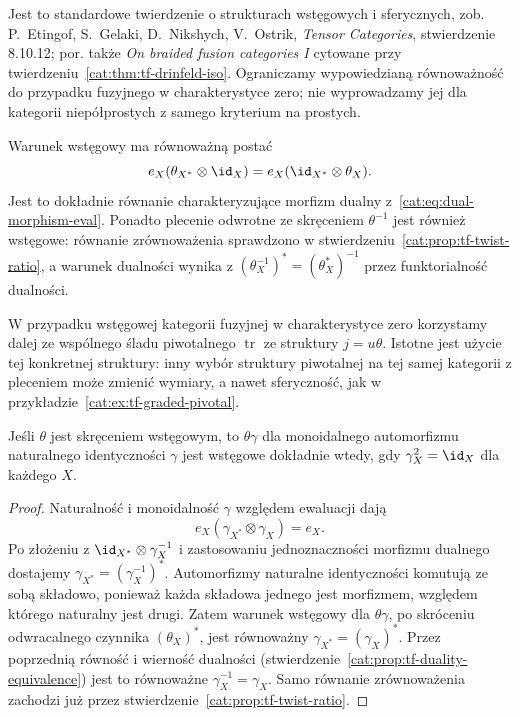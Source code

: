 Jest to standardowe twierdzenie o strukturach wstęgowych i sferycznych, zob. P.~Etingof, S.~Gelaki, D.~Nikshych, V.~Ostrik, \emph{Tensor Categories}, stwierdzenie 8.10.12; por. także \emph{On braided fusion categories I} cytowane przy twierdzeniu~\ref{cat:thm:tf-drinfeld-iso}. Ograniczamy wypowiedzianą równoważność do przypadku fuzyjnego w charakterystyce zero; nie wyprowadzamy jej dla kategorii niepółprostych z samego kryterium na prostych.

Warunek wstęgowy ma równoważną postać
\[
 e_X(\theta_{X^*}\otimes\id_X)
 =e_X(\id_{X^*}\otimes\theta_X).
\]
Jest to dokładnie równanie charakteryzujące morfizm dualny z~\eqref{cat:eq:dual-morphism-eval}. Ponadto plecenie odwrotne ze skręceniem $\theta^{-1}$ jest również wstęgowe: równanie zrównoważenia sprawdzono w stwierdzeniu~\ref{cat:prop:tf-twist-ratio}, a warunek dualności wynika z $(\theta_X^{-1})^*=(\theta_X^*)^{-1}$ przez funktorialność dualności.

W przypadku wstęgowej kategorii fuzyjnej w charakterystyce zero korzystamy dalej ze wspólnego śladu piwotalnego $\operatorname{tr}$ ze struktury $j=u\theta$. Istotne jest użycie tej konkretnej struktury: inny wybór struktury piwotalnej na tej samej kategorii z pleceniem może zmienić wymiary, a nawet sferyczność, jak w przykładzie~\ref{cat:ex:tf-graded-pivotal}.

\begin{stwierdzenie}\label{cat:prop:tf-ribbon-ratio}
Jeśli $\theta$ jest skręceniem wstęgowym, to $\theta\gamma$ dla monoidalnego automorfizmu naturalnego identyczności $\gamma$ jest wstęgowe dokładnie wtedy, gdy $\gamma_X^2=\id_X$ dla każdego $X$.
\end{stwierdzenie}
\begin{proof}
Naturalność i monoidalność $\gamma$ względem ewaluacji dają
\[
 e_X(\gamma_{X^*}\otimes\gamma_X)=e_X.
\]
Po złożeniu z $\id_{X^*}\otimes\gamma_X^{-1}$ i zastosowaniu jednoznaczności morfizmu dualnego dostajemy $\gamma_{X^*}=(\gamma_X^{-1})^*$. Automorfizmy naturalne identyczności komutują ze sobą składowo, ponieważ każda składowa jednego jest morfizmem, względem którego naturalny jest drugi. Zatem warunek wstęgowy dla $\theta\gamma$, po skróceniu odwracalnego czynnika $(\theta_X)^*$, jest równoważny $\gamma_{X^*}=(\gamma_X)^*$. Przez poprzednią równość i wierność dualności (stwierdzenie~\ref{cat:prop:tf-duality-equivalence}) jest to równoważne $\gamma_X^{-1}=\gamma_X$. Samo równanie zrównoważenia zachodzi już przez stwierdzenie~\ref{cat:prop:tf-twist-ratio}.
\end{proof}

